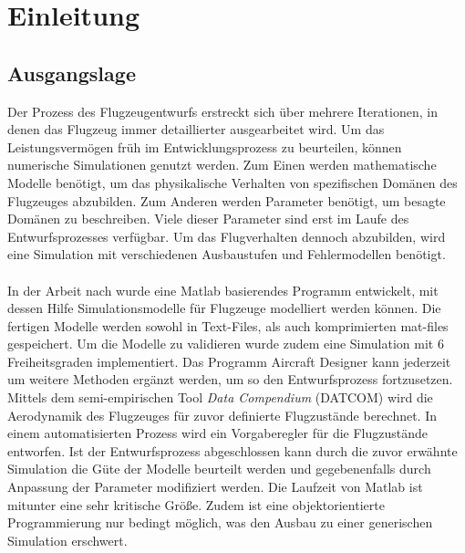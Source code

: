 \chapter{Einleitung}
\section{Ausgangslage}
\label{sec:ausgangslage}
Der Prozess des Flugzeugentwurfs erstreckt sich über mehrere Iterationen, in denen das Flugzeug immer detaillierter ausgearbeitet wird. Um das Leistungsvermögen früh im Entwicklungsprozess zu beurteilen, können numerische Simulationen genutzt werden. Zum Einen werden mathematische Modelle benötigt, um das physikalische Verhalten von spezifischen Domänen des Flugzeuges abzubilden. Zum Anderen werden Parameter benötigt, um besagte Domänen zu beschreiben. Viele dieser Parameter sind erst im Laufe des Entwurfsprozesses verfügbar. Um das Flugverhalten dennoch abzubilden, wird eine Simulation mit verschiedenen Ausbaustufen und Fehlermodellen benötigt.\\\\
In der Arbeit nach  \cite{Olucak.15.02.2017} wurde eine Matlab basierendes Programm entwickelt, mit dessen Hilfe Simulationsmodelle für Flugzeuge modelliert werden können. Die fertigen Modelle werden sowohl in Text-Files, als auch komprimierten mat-files gespeichert. Um die Modelle zu validieren wurde zudem eine Simulation mit 6 Freiheitsgraden implementiert. Das Programm Aircraft Designer kann jederzeit um weitere Methoden ergänzt werden, um so den Entwurfsprozess fortzusetzen. Mittels dem semi-empirischen Tool  \textit{Data Compendium} (DATCOM) wird die Aerodynamik des Flugzeuges für zuvor definierte Flugzustände berechnet. In einem automatisierten Prozess wird ein Vorgaberegler für die Flugzustände entworfen. Ist der Entwurfsprozess abgeschlossen kann durch die zuvor erwähnte Simulation die Güte der Modelle beurteilt werden und gegebenenfalls durch Anpassung der Parameter modifiziert werden. Die Laufzeit von Matlab ist mitunter eine sehr kritische Größe. Zudem ist eine objektorientierte Programmierung nur bedingt möglich, was den Ausbau zu einer generischen Simulation erschwert.
\newpage
